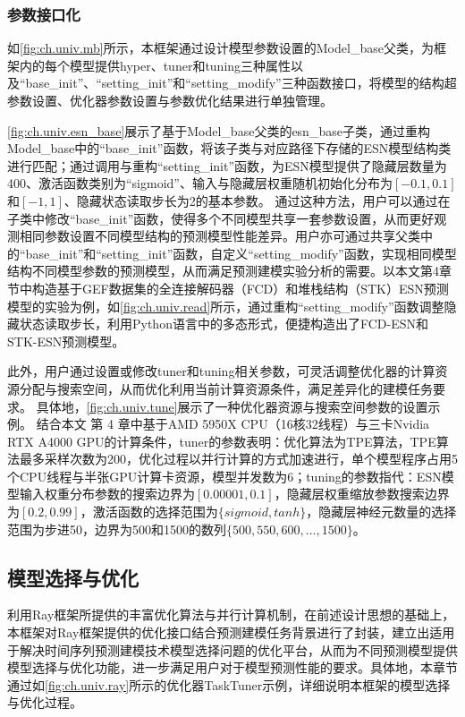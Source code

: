 
\subsubsection{参数接口化}
如\autoref{fig:ch.univ.mb}所示，本框架通过设计模型参数设置的Model_base父类，为框架内的每个模型提供hyper、tuner和tuning三种属性以及“base_init”、“setting_init”和“setting_modify”三种函数接口，将模型的结构超参数设置、优化器参数设置与参数优化结果进行单独管理。

\autoref{fig:ch.univ.esn_base}展示了基于Model_base父类的esn_base子类，通过重构Model_base中的“base_init”函数，将该子类与对应路径下存储的ESN模型结构类进行匹配；通过调用与重构“setting_init”函数，为ESN模型提供了隐藏层数量为400、激活函数类别为“sigmoid”、输入与隐藏层权重随机初始化分布为\([-0.1,0.1]\)和\([-1,1]\)、隐藏状态读取步长为2的基本参数。
通过这种方法，用户可以通过在子类中修改“base_init”函数，使得多个不同模型共享一套参数设置，从而更好观测相同参数设置不同模型结构的预测模型性能差异。用户亦可通过共享父类中的“base_init”和“setting_init”函数，自定义“setting_modify”函数，实现相同模型结构不同模型参数的预测模型，从而满足预测建模实验分析的需要。以本文第4章节中构造基于GEF数据集的全连接解码器（FCD）和堆栈结构（STK）ESN预测模型的实验为例，如\autoref{fig:ch.univ.read}所示，通过重构“setting_modify”函数调整隐藏状态读取步长，利用Python语言中的多态形式，便捷构造出了FCD-ESN和STK-ESN预测模型。

此外，用户通过设置或修改tuner和tuning相关参数，可灵活调整优化器的计算资源分配与搜索空间，从而优化利用当前计算资源条件，满足差异化的建模任务要求。
具体地，\autoref{fig:ch.univ.tune}展示了一种优化器资源与搜索空间参数的设置示例。
结合本文
第
4
章中基于AMD 5950X CPU（16核32线程）与三卡Nvidia RTX A4000 GPU的计算条件，tuner的参数表明：优化算法为TPE算法，TPE算法最多采样次数为200，优化过程以并行计算的方式加速进行，单个模型程序占用5个CPU线程与半张GPU计算卡资源，模型并发数为6；tuning的参数指代：ESN模型输入权重分布参数的搜索边界为\([0.00001, 0.1]\)，隐藏层权重缩放参数搜索边界为\([0.2, 0.99]\)，激活函数的选择范围为\(\{sigmoid, tanh\}\)，隐藏层神经元数量的选择范围为步进50，边界为500和1500的数列\(\{500, 550, 600, \ldots, 1500\}\)。


\subsection{模型选择与优化}
利用Ray框架所提供的丰富优化算法与并行计算机制，在前述设计思想的基础上，本框架对Ray框架提供的优化接口结合预测建模任务背景进行了封装，建立出适用于解决时间序列预测建模技术模型选择问题的优化平台，从而为不同预测模型提供模型选择与优化功能，进一步满足用户对于模型预测性能的要求。具体地，本章节通过如\autoref{fig:ch.univ.ray}所示的优化器TaskTuner示例，详细说明本框架的模型选择与优化过程。

